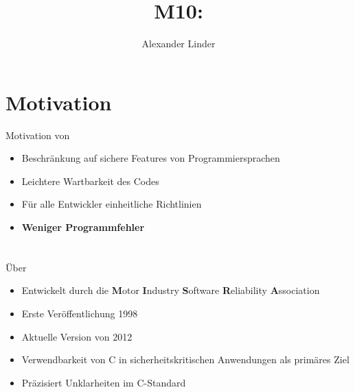 \documentclass{beamer}
\title{M10: \sqss}
\author[Linder]{Alexander Linder}
\date{} %
\institute{FAKULTÄT FÜR INFORMATIK}
\begin{document}

    \begin{frame}
        \maketitle
    \end{frame}

    \begin{frame}
        \tableofcontents
    \end{frame}

    \section{Motivation}
    \label{sec:motivation}
    \begin{frame}{Motivation von \sqss}
        \begin{itemize}
            \item Beschränkung auf sichere Features von Programmiersprachen
            \item Leichtere Wartbarkeit des Codes
            \item Für alle Entwickler einheitliche Richtlinien
            \pause
            \item \textbf{Weniger Programmfehler}
        \end{itemize}
    \end{frame}

    \section{\misra}
    \label{sec:misra-c}
    \begin{frame}{Über \misra}
        \begin{itemize}
            \item Entwickelt durch die \textbf{M}otor \textbf{I}ndustry \textbf{S}oftware \textbf{R}eliability \textbf{A}ssociation
            \item Erste Veröffentlichung 1998
            \item Aktuelle Version von 2012
            \item Verwendbarkeit von C in sicherheitskritischen Anwendungen als primäres Ziel
            \item Präzisiert Unklarheiten im C-Standard
        \end{itemize}
    \end{frame}
\end{document}
